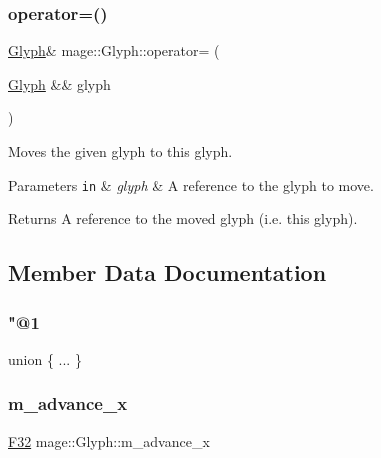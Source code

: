 \subsubsection{\texorpdfstring{operator=()}{operator=()}\hspace{0.1cm}{\footnotesize\ttfamily [2/2]}}
{\footnotesize\ttfamily \hyperlink{structmage_1_1_glyph}{Glyph}\& mage\+::\+Glyph\+::operator= (\begin{DoxyParamCaption}\item[{\hyperlink{structmage_1_1_glyph}{Glyph} \&\&}]{glyph }\end{DoxyParamCaption})\hspace{0.3cm}{\ttfamily [default]}}

Moves the given glyph to this glyph.


\begin{DoxyParams}[1]{Parameters}
\mbox{\tt in}  & {\em glyph} & A reference to the glyph to move. \\
\hline
\end{DoxyParams}
\begin{DoxyReturn}{Returns}
A reference to the moved glyph (i.\+e. this glyph). 
\end{DoxyReturn}


\subsection{Member Data Documentation}
\hypertarget{structmage_1_1_glyph_aa38d552d3a79706060b5dde53bd38881}{}\label{structmage_1_1_glyph_aa38d552d3a79706060b5dde53bd38881} 
\subsubsection{\texorpdfstring{"@1}{@1}}
{\footnotesize\ttfamily union \{ ... \} }

\hypertarget{structmage_1_1_glyph_ac0905a82d2f5adefb7930359a0b3cef8}{}\label{structmage_1_1_glyph_ac0905a82d2f5adefb7930359a0b3cef8} 
\subsubsection{\texorpdfstring{m\+\_\+advance\+\_\+x}{m\_advance\_x}}
{\footnotesize\ttfamily \hyperlink{namespacemage_aa97e833b45f06d60a0a9c4fc22ae02c0}{F32} mage\+::\+Glyph\+::m\+\_\+advance\+\_\+x}

